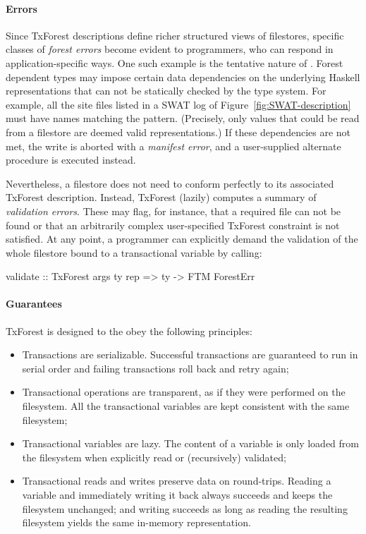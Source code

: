 \paragraph{Errors}
Since TxForest descriptions define richer structured views of filestores, specific classes of \emph{forest errors} become evident to programmers, who can respond in application-specific ways.
One such example is the tentative nature of . Forest dependent types may impose certain data dependencies on the underlying Haskell representations that can not be statically checked by the type system. For example, all the site files listed in a SWAT log of Figure~\ref{fig:SWAT-description} must have names matching the  pattern. (Precisely, only values that could be read from a filestore are deemed valid representations.) If these dependencies are not met, the write is aborted with a \emph{manifest error}, and a user-supplied alternate procedure is executed instead.

Nevertheless, a filestore does not need to conform perfectly to its associated TxForest description.
Instead, TxForest (lazily) computes a summary of \emph{validation errors}. These may flag, for instance, that a required file can not be found or that an arbitrarily complex user-specified TxForest constraint is not satisfied.
At any point, a programmer can explicitly demand the validation of the whole filestore bound to a transactional variable by calling:
\begin{code}
validate :: TxForest args ty rep => ty -> FTM ForestErr
\end{code}


\paragraph{Guarantees}
TxForest is designed to the obey the following principles:
\begin{itemize} 
	\item Transactions are serializable. Successful transactions are guaranteed to run in serial order and failing transactions roll back and retry again;
	\item Transactional operations are transparent, as if they were performed on the filesystem. All the transactional variables are kept consistent with the same filesystem;
	\item Transactional variables are lazy. The content of a variable is only loaded from the filesystem when explicitly read or (recursively) validated;
	\item Transactional reads and writes preserve data on round-trips. Reading a variable and immediately writing it back always succeeds and keeps the filesystem unchanged; and writing succeeds as long as reading the resulting filesystem yields the same in-memory representation.
\end{itemize}




